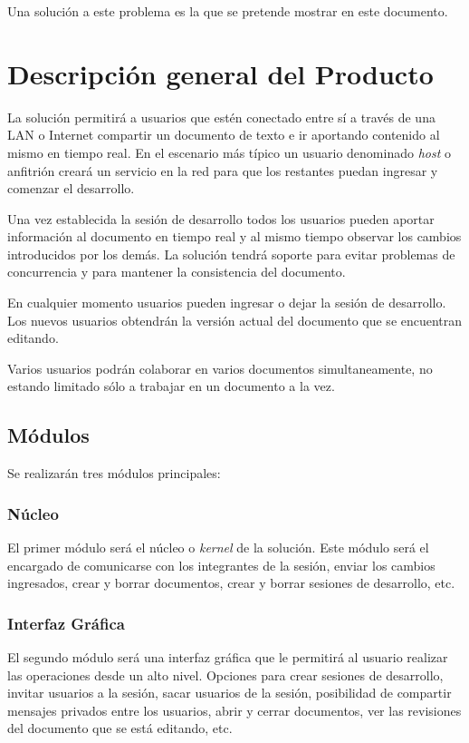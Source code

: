 \documentclass[a4paper,11pt]{article}
\begin{document}
		    Una soluci\'on a este problema es la que se pretende mostrar en este documento.

	\section{Descripci\'on general del Producto}
		La soluci\'on permitir\'a a usuarios que est\'en conectado entre s\'i a trav\'es de
		una LAN o Internet compartir un documento de texto e ir aportando contenido al mismo en
		tiempo real. En el escenario m\'as t\'ipico un usuario denominado \textit{host} o
		anfitri\'on crear\'a un servicio en la red para que los restantes puedan ingresar y
		comenzar el desarrollo.

		Una vez establecida la sesi\'on de desarrollo todos los usuarios pueden aportar
		informaci\'on al documento en tiempo real y al mismo tiempo observar los cambios
		introducidos por los dem\'as. La soluci\'on tendr\'a soporte para evitar problemas de
		concurrencia y para mantener la consistencia del documento.

	    En cualquier momento usuarios pueden ingresar o dejar la sesi\'on de desarrollo. Los
	    nuevos usuarios obtendr\'an la versi\'on actual del documento que se encuentran editando.

	    Varios usuarios podr\'an colaborar en varios documentos simultaneamente, no estando
	    limitado s\'olo a trabajar en un documento a la vez.

		\subsection{M\'odulos}
			Se realizar\'an tres m\'odulos principales:

				\subsubsection{N\'ucleo}
					El primer m\'odulo ser\'a el n\'ucleo o \textit{kernel} de la soluci\'on.
					Este m\'odulo ser\'a el encargado de comunicarse con los integrantes de
					la sesi\'on, enviar los cambios ingresados, crear y borrar documentos,
					crear y borrar sesiones de desarrollo, etc.

				\subsubsection{Interfaz Gr\'afica}
					El segundo m\'odulo ser\'a una interfaz gr\'afica que le permitir\'a al
					usuario realizar las operaciones desde un alto nivel. Opciones para crear
					sesiones de desarrollo, invitar usuarios a la sesi\'on, sacar usuarios de
					la sesi\'on, posibilidad de compartir mensajes privados entre los usuarios,
					abrir y cerrar documentos, ver las revisiones del documento que se est\'a
					editando, etc.
\end{document}

